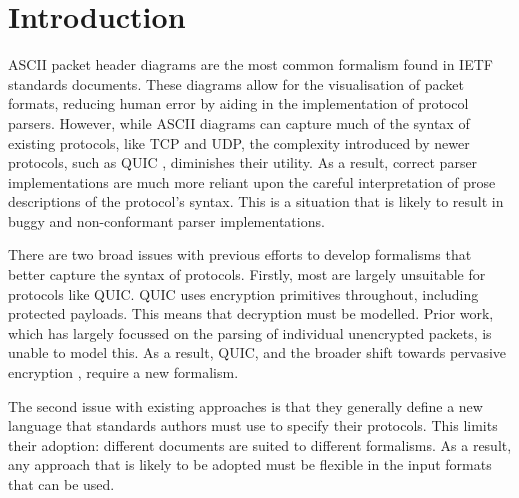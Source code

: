 \documentclass[10pt,sigconf]{acmart}
\begin{document}
\section{Introduction}

%

ASCII packet header diagrams are the most common formalism found in IETF standards
documents. These diagrams allow for the visualisation of packet formats, reducing human error
by aiding in the implementation of protocol parsers. However, while ASCII diagrams can
capture much of the syntax of existing protocols, like TCP and UDP, the complexity
introduced by newer protocols, such as QUIC \cite{draft-ietf-quic-transport-latest},
diminishes their utility. As a result, correct parser implementations are much more
reliant upon the careful interpretation of prose descriptions of the protocol's syntax.
This is a situation that is likely to result in buggy and non-conformant parser implementations.


There are two broad issues with previous efforts to develop formalisms that better capture
the syntax of protocols. Firstly, most are largely unsuitable for protocols like QUIC.
QUIC uses encryption primitives throughout, including protected payloads. This means that
decryption must be modelled. Prior work, which has largely focussed on the parsing of
individual unencrypted packets, is unable to model this. As a result, QUIC, and the broader
shift towards pervasive encryption \cite{rfc7258}, require a new formalism.

The second issue with existing approaches is that they generally define a new language
that standards authors must use to specify their protocols. This limits their adoption:
different documents are suited to different formalisms. As a result,
any approach that is likely to be adopted must be flexible in the input formats that can
be used.
\end{document}
